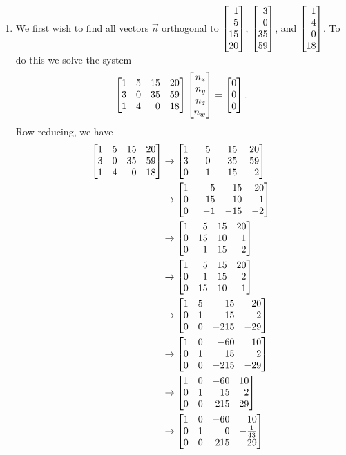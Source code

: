 \begin{exercises}
\begin{problist}
\begin{solution}
\begin{enumerate}
					\item We first wish to find all vectors $\vec n$ orthogonal to $\mat{1\\5\\15\\20}$, $\mat{3\\0\\35\\59}$, and $\mat{1\\4\\0\\18}$. 
						To do this we solve the system \[\mat{1&5&15&20\\3&0&35&59\\1&4&0&18}\mat{n_x\\n_y\\n_z\\n_w}=\mat{0\\0\\0}.\] 
						Row reducing, we have 
						\begin{align*}
							\mat{1&5&15&20\\3&0&35&59\\1&4&0&18}&\rightarrow \mat{1&5&15&20\\3&0&35&59\\0&-1&-15&-2}\\
							&\rightarrow \mat{1&5&15&20\\0&-15&-10&-1\\0&-1&-15&-2}\\
							&\rightarrow \mat{1&5&15&20\\0&15&10&1\\0&1&15&2}\\
							&\rightarrow \mat{1&5&15&20\\0&1&15&2\\0&15&10&1}\\
							&\rightarrow \mat{1&5&15&20\\0&1&15&2\\0&0&-215&-29}\\
							&\rightarrow \mat{1&0&-60&10\\0&1&15&2\\0&0&-215&-29}\\
							&\rightarrow \mat{1&0&-60&10\\0&1&15&2\\0&0&215&29}\\
							&\rightarrow \mat{1&0&-60&10\\0&1&0&-\frac{1}{43}\\0&0&215&29}\\

\end{align*}
\end{enumerate}
\end{solution}
\end{problist}
\end{exercises}
